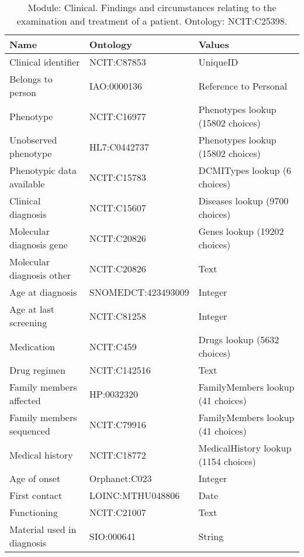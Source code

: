 \documentclass{article}
\begin{document}
\begin{table}[htb]
\begin{tabular}{lll}
Name & Ontology & Values \\
\hline
Clinical identifier & NCIT:C87853 & UniqueID \\
Belongs to person & IAO:0000136 & Reference to Personal \\
Phenotype & NCIT:C16977 & Phenotypes lookup (15802 choices) \\
Unobserved phenotype & HL7:C0442737 & Phenotypes lookup (15802 choices) \\
Phenotypic data available & NCIT:C15783 & DCMITypes lookup (6 choices) \\
Clinical diagnosis & NCIT:C15607 & Diseases lookup (9700 choices) \\
Molecular diagnosis gene & NCIT:C20826 & Genes lookup (19202 choices) \\
Molecular diagnosis other & NCIT:C20826 & Text \\
Age at diagnosis & SNOMEDCT:423493009 & Integer \\
Age at last screening & NCIT:C81258 & Integer \\
Medication & NCIT:C459 & Drugs lookup (5632 choices) \\
Drug regimen & NCIT:C142516 & Text \\
Family members affected & HP:0032320 & FamilyMembers lookup (41 choices) \\
Family members sequenced & NCIT:C79916 & FamilyMembers lookup (41 choices) \\
Medical history & NCIT:C18772 & MedicalHistory lookup (1154 choices) \\
Age of onset & Orphanet:C023 & Integer \\
First contact & LOINC:MTHU048806 & Date \\
Functioning & NCIT:C21007 & Text \\
Material used in diagnosis & SIO:000641 & String \\
\hline
\end{tabular}
\caption[Module: Clinical]{\label{table:table6} Module: Clinical. Findings and circumstances relating to the examination and treatment of a patient. Ontology: NCIT:C25398. }
\end{table}
\end{document}
